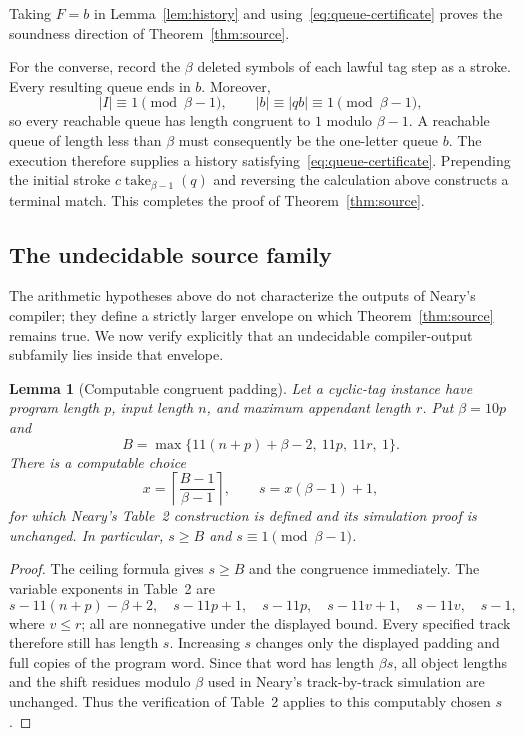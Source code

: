 \documentclass[11pt]{article}
\newtheorem{lemma}[theorem]{Lemma}
\begin{document}
Taking $F=b$ in Lemma~\ref{lem:history} and using~\eqref{eq:queue-certificate} proves the
soundness direction of Theorem~\ref{thm:source}.

For the converse, record the $\beta$ deleted symbols of each lawful tag step as a stroke.
Every resulting queue ends in $b$.  Moreover,
\[
  |I|\equiv1\pmod{\beta-1},\qquad
  |b|\equiv|qb|\equiv1\pmod{\beta-1},
\]
so every reachable queue has length congruent to $1$ modulo $\beta-1$.  A reachable queue
of length less than $\beta$ must consequently be the one-letter queue $b$.  The execution
therefore supplies a history satisfying~\eqref{eq:queue-certificate}.  Prepending the
initial stroke $c\operatorname{take}_{\beta-1}(q)$ and reversing the calculation above
constructs a terminal match.  This completes the proof of Theorem~\ref{thm:source}.

\subsection{The undecidable source family}

The arithmetic hypotheses above do not characterize the outputs of Neary's compiler; they
define a strictly larger envelope on which Theorem~\ref{thm:source} remains true.  We now
verify explicitly that an undecidable compiler-output subfamily lies inside that envelope.

\begin{lemma}[Computable congruent padding]\label{lem:padding}
Let a cyclic-tag instance have program length $p$, input length $n$, and maximum appendant
length $r$.  Put $\beta=10p$ and
\[
 B=\max\{11(n+p)+\beta-2,\ 11p,\ 11r,\ 1\}.
\]
There is a computable choice
\[
 x=\left\lceil\frac{B-1}{\beta-1}\right\rceil,
 \qquad s=x(\beta-1)+1,
\]
for which Neary's Table~2 construction is defined and its simulation proof is unchanged.
In particular, $s\ge B$ and $s\equiv1\pmod{\beta-1}$.
\end{lemma}

\begin{proof}
The ceiling formula gives $s\ge B$ and the congruence immediately.  The variable exponents
in Table~2 are
\[
 s-11(n+p)-\beta+2,\quad s-11p+1,\quad s-11p,\quad
 s-11v+1,\quad s-11v,\quad s-1,
\]
where $v\le r$; all are nonnegative under the displayed bound.  Every specified track
therefore still has length $s$.  Increasing $s$ changes only the displayed padding and full
copies of the program word.  Since that word has length $\beta s$, all object lengths and
the shift residues modulo $\beta$ used in Neary's track-by-track simulation are unchanged.
Thus the verification of Table~2 applies to this computably chosen $s$.
\end{proof}
\end{document}
